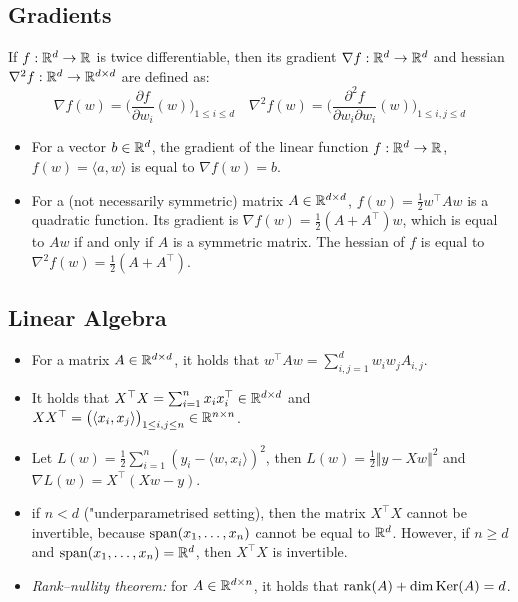 \subsection{Gradients}

If $f : \mathbb{R}^d \to \mathbb{R}$ is twice differentiable, then its gradient $\nabla f : \mathbb{R}^d \to \mathbb{R}^d$ and hessian $\nabla^2 f : \mathbb{R}^d \to \mathbb{R}^{d \times d}$ are defined as: 
\[\nabla f(w) = \Big ( \frac{\partial f}{\partial w_i}(w) \Big )_{1 \leq i \leq d} \quad \nabla^2 f(w) = \Big ( \frac{\partial^2 f}{\partial w_i \partial w_i}(w) \Big )_{1 \leq i, j \leq d} \] 

\begin{itemize}
    \item For a vector $b \in \mathbb{R}^d$, the gradient of the linear function $f : \mathbb{R}^d \to \mathbb{R}$, $f(w) = \langle a , w \rangle $ is equal to $\nabla f(w) = b$. 
    \item For a (not necessarily symmetric) matrix $A \in \mathbb{R}^{d \times d}$, $f(w) = \frac{1}{2} w^\top A w$ is a quadratic function. Its gradient is $\nabla f(w) = \frac{1}{2} (A + A^\top) w$, which is equal to $A w$ if and only if $A$ is a symmetric matrix. The hessian of $f$ is equal to $\nabla^2 f(w) = \frac{1}{2} (A + A^\top)$. 
\end{itemize}

\subsection{Linear Algebra}

\begin{itemize}
    \item For a matrix $A \in \mathbb{R}^{d \times d}$, it holds that $w^\top A w = \sum_{i, j = 1}^d w_i w_j A_{i, j}$. 
    \item It holds that $X^\top X = \sum_{i=1}^n x_i x_i^\top \in \mathbb{R}^{d \times d}$ and $X X^\top = \big (\langle x_i, x_j \rangle \big )_{1 \leq i, j \leq n} \in \mathbb{R}^{n \times n}$.
    \item Let $L(w) = \frac{1}{2} \sum_{i = 1}^n (y_i - \langle w, x_i \rangle)^2$, then $L(w) = \frac{1}{2} \Vert y - X w \Vert^2$ and $\nabla L(w) = X^\top (X w - y)$.
    \item if $n < d$ ("underparametrised setting), then the matrix $X^\top X$ cannot be invertible, because $\mathrm{span} (x_1, \dots, x_n)$ cannot be equal to $\mathbb{R}^d$. However, if $n \geq d$ and $\mathrm{span} (x_1, \dots, x_n) = \mathbb{R}^d$, then $X^\top X$ is invertible.
    \item \textit{Rank–nullity theorem:} for $A \in \mathbb{R}^{d \times n}$, it holds that $\rank(A) + \dim \mathrm{Ker}(A) = d$.
\end{itemize}


